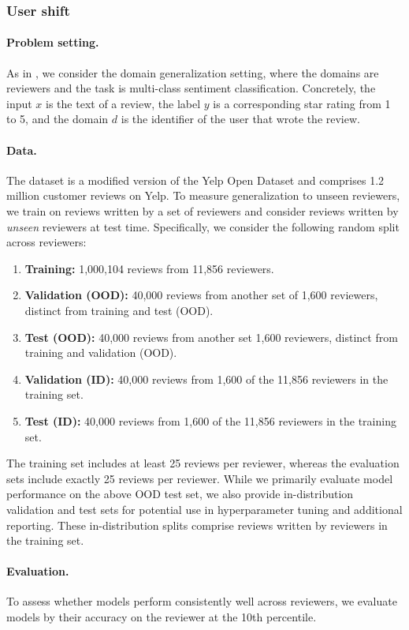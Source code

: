 \subsubsection{User shift}
\paragraph{Problem setting.}
As in \Amazon, we consider the domain generalization setting, where the domains are reviewers and the task is multi-class sentiment classification.
Concretely, the input $x$ is the text of a review, the label $y$ is a corresponding star rating from 1 to 5, and the domain $d$ is the identifier of the user that wrote the review.

\paragraph{Data.}
The dataset is a modified version of the Yelp Open Dataset and comprises 1.2 million customer reviews on Yelp.
To measure generalization to unseen reviewers, we train on reviews written by a set of reviewers and consider reviews written by \emph{unseen} reviewers at test time.
Specifically, we consider the following random split across reviewers:
\begin{enumerate}
  \item \textbf{Training:} 1,000,104 reviews from 11,856 reviewers.
  \item \textbf{Validation (OOD):} 40,000 reviews from another set of 1,600 reviewers, distinct from training and test (OOD).
  \item \textbf{Test (OOD):} 40,000 reviews from another set 1,600 reviewers, distinct from training and validation (OOD).
  \item \textbf{Validation (ID):} 40,000 reviews from 1,600 of the 11,856 reviewers in the training set.
  \item \textbf{Test (ID):} 40,000 reviews from 1,600 of the 11,856 reviewers in the training set.
\end{enumerate}
The training set includes at least 25 reviews per reviewer, whereas the evaluation sets include exactly 25 reviews per reviewer.
While we primarily evaluate model performance on the above OOD test set, we also provide in-distribution validation and test sets for potential use in hyperparameter tuning and additional reporting.
These in-distribution splits comprise reviews written by reviewers in the training set.

\paragraph{Evaluation.}
To assess whether models perform consistently well across reviewers, we evaluate models by their accuracy on the reviewer at the 10th percentile.

